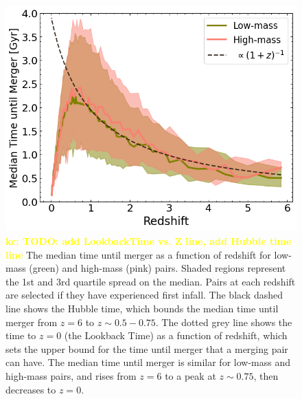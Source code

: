\documentclass[twocolumn]{aastex631}
\newcommand{\kc}[1]{\textcolor{yellow}{\textbf{kc: #1}} }
\begin{document}
\begin{figure}[htb]
    \centering
    \includegraphics[width=\textwidth]{plots/bet-on-it/3_time_til_merger_full_fit.png}
    \caption{\kc{TODO: add LookbackTime vs. Z line, add Hubble time line} The median time until merger as a function of redshift for low-mass (green) and high-mass (pink) pairs. Shaded regions represent the 1st and 3rd quartile spread on the median. Pairs at each redshift are selected if they have experienced first infall. 
    The black dashed line shows the Hubble time, which bounds the median time until merger from $z=6$ to $z\sim0.5-0.75$.
    The dotted grey line shows the time to $z=0$ (the Lookback Time) as a function of redshift, which sets the upper bound for the time until merger that a merging pair can have. 
    The median time until merger is similar for low-mass and high-mass pairs, and rises from $z=6$ to a peak at $z\sim0.75$, then decreases to $z=0$.}
    \label{fig:timescales}
\end{figure}
\end{document}
